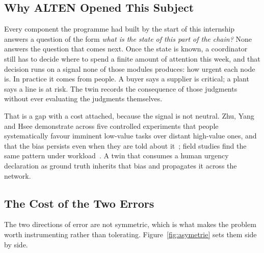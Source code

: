 
\subsection{Why ALTEN Opened This Subject}
\label{sec:pourquoi}

Every component the programme had built by the start of this internship answers a question of
the form \emph{what is the state of this part of the chain?} None answers the question that
comes next. Once the state is known, a coordinator still has to decide where to spend a finite
amount of attention this week, and that decision runs on a signal none of those modules
produces: how urgent each node is. In practice it comes from people. A buyer says a supplier is
critical; a plant says a line is at risk. The twin records the consequence of those judgments
without ever evaluating the judgments themselves.

That is a gap with a cost attached, because the signal is not neutral. Zhu, Yang and Hsee
demonstrate across five controlled experiments that people systematically favour imminent
low-value tasks over distant high-value ones, and that the bias persists even when they are
told about it~\autocite{zhu2018mere}; field studies find the same pattern under
workload~\autocite{rusou2020psychology,diwa2020task}. A twin that consumes a human urgency
declaration as ground truth inherits that bias and propagates it across the network.

\subsection{The Cost of the Two Errors}

The two directions of error are not symmetric, which is what makes the problem worth
instrumenting rather than tolerating. Figure~\ref{fig:asymetrie} sets them side by side.

